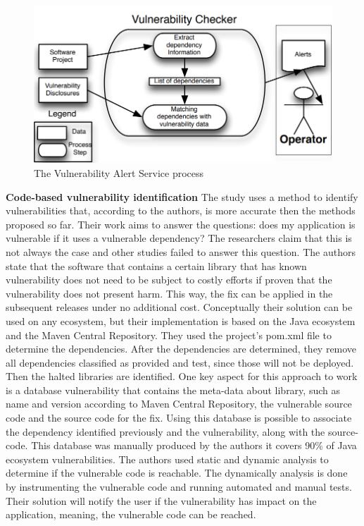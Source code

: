 \documentclass[pdf,bookmarks,colorlinks=true]{IEEEtran}
\begin{document}
\begin{figure}[h]
	\centering
	\includegraphics[scale=0.28]{VASProcess.png}
	\caption{The Vulnerability Alert Service process}
	\label{VASProcess}
\end{figure}


\textbf{Code-based vulnerability identification}
The study \cite{Ponta2018} uses a method to identify vulnerabilities that, according to the authors, is more accurate then the methods proposed so far. Their work aims to answer the questions: does my application is vulnerable if it uses a vulnerable dependency? The researchers claim that this is not always the case and other studies failed to answer this question. The authors state that the software that contains a certain library that has known vulnerability does not need to be subject to costly efforts if proven that the vulnerability does not present harm. This way, the fix can be applied in the subsequent releases under no additional cost. Conceptually their solution can be used on any ecosystem, but their implementation is based on the Java ecosystem and the Maven Central Repository. They used the project’s pom.xml file to determine the dependencies. After the dependencies are determined, they remove all dependencies classified as provided and test, since those will not be deployed. Then the halted libraries are identified. 
One key aspect for this approach to work is a database vulnerability that contains the meta-data about library, such as name and version according to Maven Central Repository, the vulnerable source code and the source code for the fix. Using this database is possible to associate the dependency identified previously and the vulnerability, along with the source-code. This database was manually produced by the authors it covers 90\% of Java ecosystem vulnerabilities.
The authors used static and dynamic analysis to determine if the vulnerable code is reachable. The dynamically analysis is done by instrumenting the vulnerable code and running automated and manual tests.
Their solution will notify the user if the vulnerability has impact on the application, meaning, the vulnerable code can be reached.
\end{document}
